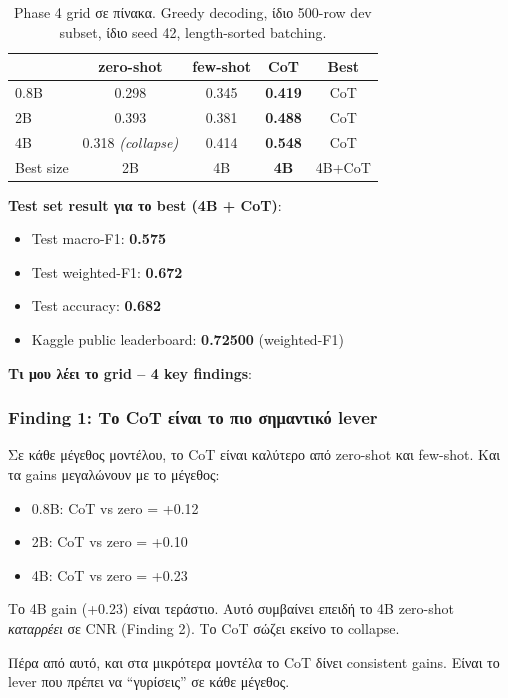 \documentclass[12pt]{fphw}
\begin{document}
\begin{table}[H]
\centering
\small
\begin{tabular}{l|ccc|c}
\toprule
 & zero-shot & few-shot & CoT & Best \\
\midrule
0.8B & 0.298 & 0.345 & \textbf{0.419} & CoT \\
2B   & 0.393 & 0.381 & \textbf{0.488} & CoT \\
4B   & 0.318 \emph{(collapse)} & 0.414 & \textbf{0.548} & CoT \\
\midrule
Best size & 2B & 4B & \textbf{4B} & 4B+CoT \\
\bottomrule
\end{tabular}
\caption{Phase 4 grid σε πίνακα. Greedy decoding, ίδιο 500-row dev subset, ίδιο seed 42, length-sorted batching.}
\end{table}

\textbf{Test set result για το best (4B + CoT)}:

\begin{itemize}
    \item Test macro-F1: \textbf{0.575}
    \item Test weighted-F1: \textbf{0.672}
    \item Test accuracy: \textbf{0.682}
    \item Kaggle public leaderboard: \textbf{0.72500} (weighted-F1)
\end{itemize}

\textbf{Τι μου λέει το grid -- 4 key findings}:

\subsubsection{Finding 1: Το CoT είναι το πιο σημαντικό lever}

Σε κάθε μέγεθος μοντέλου, το CoT είναι καλύτερο από zero-shot και few-shot. Και τα gains μεγαλώνουν με το μέγεθος:

\begin{itemize}
    \item 0.8B: CoT vs zero = +0.12
    \item 2B: CoT vs zero = +0.10
    \item 4B: CoT vs zero = +0.23
\end{itemize}

Το 4B gain (+0.23) είναι τεράστιο. Αυτό συμβαίνει επειδή το 4B zero-shot \emph{καταρρέει} σε CNR (Finding 2). Το CoT σώζει εκείνο το collapse.

Πέρα από αυτό, και στα μικρότερα μοντέλα το CoT δίνει consistent gains. Είναι το lever που πρέπει να ``γυρίσεις'' σε κάθε μέγεθος.
\end{document}
